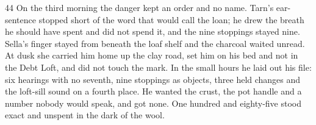 \begin{CRchronicle}{44}
On the third morning the danger kept an order and no name. Tarn’s ear-sentence stopped short of the word that would call the loan; he drew the breath he should have spent and did not spend it, and the nine stoppings stayed nine. Sella’s finger stayed from beneath the loaf shelf and the charcoal waited unread. At dusk she carried him home up the clay road, set him on his bed and not in the Debt Loft, and did not touch the mark. In the small hours he laid out his file: six hearings with no seventh, nine stoppings as objects, three held changes and the loft-sill sound on a fourth place. He wanted the crust, the pot handle and a number nobody would speak, and got none. One hundred and eighty-five stood exact and unspent in the dark of the wool.
\end{CRchronicle}
